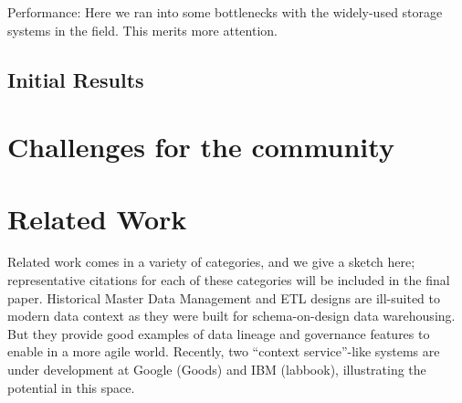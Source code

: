 \documentclass{sig-alternate}
\begin{document}
Performance: Here we ran into some bottlenecks with the widely-used storage systems in the field.  This merits more attention.

\subsection{Initial Results}
\label{sec:perf}

\section{Challenges for the community}
\label{sec:challenges}

\section{Related Work}
\label{sec:relwork}
Related work comes in a variety of categories, and we give a sketch here; representative citations for each of these categories will be included in the final paper. 
Historical Master Data Management and ETL designs are ill-suited to modern data context as they were built for schema-on-design data warehousing.  But they provide good examples of data lineage and governance features to enable in a more agile world. Recently, two ``context service''-like systems are under development at Google (Goods) and IBM (labbook), illustrating the potential in this space.   
\end{document}
